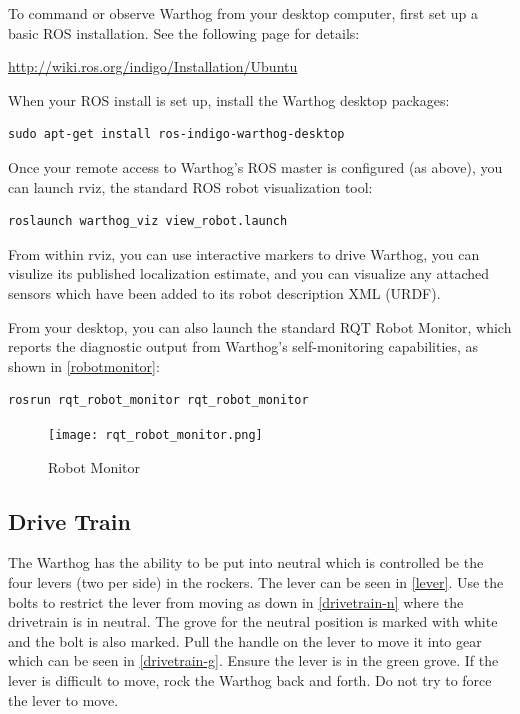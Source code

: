 \documentclass[]{clearpath-latex/clearpath-manual}
\begin{document}
To command or observe Warthog from your desktop computer, first set up a basic ROS installation.  See the following page for details:

\url{http://wiki.ros.org/indigo/Installation/Ubuntu}

When your ROS install is set up, install the Warthog desktop packages:

\begin{lstlisting}
sudo apt-get install ros-indigo-warthog-desktop
\end{lstlisting}

Once your remote access to Warthog's ROS master is configured (as above), you can launch rviz, the standard ROS robot visualization tool:

\begin{lstlisting}
roslaunch warthog_viz view_robot.launch
\end{lstlisting}

From within rviz, you can use interactive markers to drive Warthog, you can visulize its published localization estimate, and you can visualize any attached sensors which have been added to its robot description XML (URDF).

\pagebreak[4]

From your desktop, you can also launch the standard RQT Robot Monitor, which reports the diagnostic output from Warthog's self-monitoring capabilities, as shown in \autoref{robotmonitor}:

\begin{lstlisting}
rosrun rqt_robot_monitor rqt_robot_monitor
\end{lstlisting}

\begin{figure}[!htb]
  \centering
  \texttt{[image: rqt\_robot\_monitor.png]}
  \caption{Robot Monitor}
  \label{robotmonitor}
\end{figure}


\subsection{Drive Train}

The Warthog has the ability to be put into neutral which is controlled be the four levers (two per side) in the rockers.  The lever can be seen in \autoref{lever}.  Use the bolts to restrict the lever from moving as down in \autoref{drivetrain-n} where the drivetrain is in neutral.  The grove for the neutral position is marked with white and the bolt is also marked.  Pull the handle on the lever to move it into gear which can be seen in \autoref{drivetrain-g}.  Ensure the lever is in the green grove.  If the lever is difficult to move, rock the Warthog back and forth.  Do not try to force the lever to move.
\end{document}
